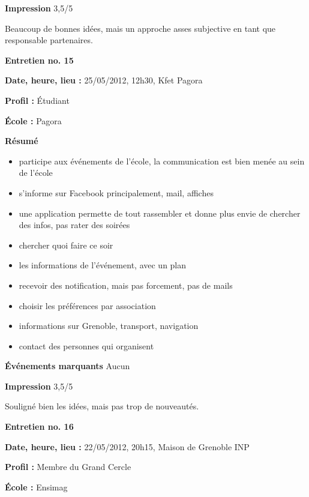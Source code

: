 \documentclass[a4paper, 11px]{article}
\begin{document}
\textbf{Impression}
3,5/5

Beaucoup de bonnes idées, mais un approche asses subjective en tant que responsable partenaires.



\vspace{.3cm}

 \textbf {\large Entretien no. 15}

\textbf{Date, heure, lieu : }
25/05/2012, 12h30, Kfet Pagora

\textbf{Profil : }
Étudiant 

\textbf{École : }
Pagora

\textbf{Résumé}
	\begin{itemize}
		\item participe aux événements de l'école, la communication est bien menée au sein de l'école 
		\item s'informe sur Facebook principalement, mail, affiches
		\item une application permette de tout rassembler et donne plus envie de chercher des infos, pas rater des soirées
		\item chercher quoi faire ce soir
		\item les informations de l'événement, avec un plan 
		\item recevoir des notification, mais pas forcement, pas de mails
		\item choisir les préférences par association
		\item informations sur Grenoble, transport, navigation
		\item contact des personnes qui organisent
	\end{itemize}

\textbf{Événements marquants}
Aucun

\textbf{Impression}
3,5/5

Souligné bien les idées, mais pas trop de nouveautés.


\vspace{.3cm}

 \textbf {\large Entretien no. 16}

\textbf{Date, heure, lieu : }
22/05/2012, 20h15, Maison de Grenoble INP

\textbf{Profil : }
Membre du Grand Cercle

\textbf{École : }
Ensimag
\end{document}
